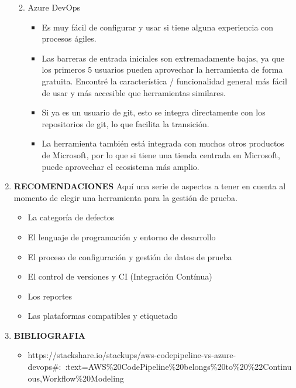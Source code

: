 \documentclass[12pt,a4paper,oneside]{book}
\begin{document}
\begin{enumerate}
\begin{enumerate}
\begin{itemize}
						\end{itemize}
					\item Azure DevOps
						\begin{itemize}
							\item Es muy fácil de configurar y usar si tiene alguna experiencia con procesos ágiles. 
							\item Las barreras de entrada iniciales son extremadamente bajas, ya que los primeros 5 usuarios pueden aprovechar la herramienta de forma gratuita. Encontré la característica / funcionalidad general más fácil de usar y más accesible que herramientas similares. 
							\item Si ya es un usuario de git, esto se integra directamente con los repositorios de git, lo que facilita la transición. 
							\item La herramienta también está integrada con muchos otros productos de Microsoft, por lo que si tiene una tienda centrada en Microsoft, puede aprovechar el ecosistema más amplio.
							
							
						\end{itemize}
				\end{enumerate}
				
		
		\item \textbf{RECOMENDACIONES}
			Aquí una serie de aspectos a tener en cuenta al momento de elegir una herramienta para la gestión de prueba.
			
			\begin{itemize}
				\item La categoría de defectos
				\item El lenguaje de programación y entorno de desarrollo
				\item El proceso de configuración y gestión de datos de prueba
				\item El control de versiones y CI (Integración Contínua)
				\item Los reportes
				\item Las plataformas compatibles y etiquetado
				
			\end{itemize}
			
		\item \textbf{BIBLIOGRAFIA}
			\begin{itemize}
				
			\item https://stackshare.io/stackups/aws-codepipeline-vs-azure-devops\#:~:text=AWS\%20CodePipeline\%20belongs\%20to\%20\%22Continuous,Workflow\%20Modeling
			

\end{itemize}
\end{enumerate}
\end{document}
